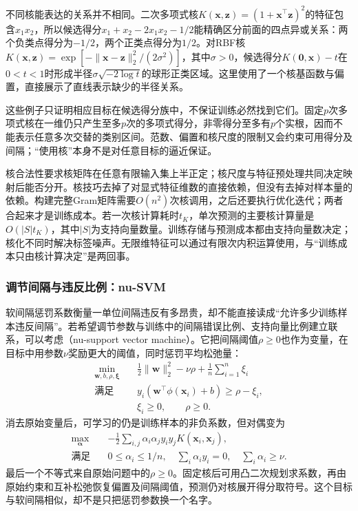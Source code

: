 不同核能表达的关系并不相同。二次多项式核$K(\bm x,\bm z)=(1+\bm x^\top\bm z)^2$的特征包含$x_1x_2$，所以候选得分$x_1+x_2-2x_1x_2-1/2$能精确区分前面的四点异或关系：两个负类点得分为$-1/2$，两个正类点得分为$1/2$。对RBF核$K(\bm x,\bm z)=\exp[-\|\bm x-\bm z\|_2^2/(2\sigma^2)]$，其中$\sigma>0$，候选得分$K(\bm0,\bm x)-t$在$0<t<1$时形成半径$\sigma\sqrt{-2\log t}$的球形正类区域。这里使用了一个核基函数与偏置，直接展示了直线表示缺少的半径关系。

这些例子只证明相应目标在候选得分族中，不保证训练必然找到它们。固定$p$次多项式核在一维仍只产生至多$p$次的多项式得分，非零得分至多有$p$个实根，因而不能表示任意多次交替的类别区间。范数、偏置和核尺度的限制又会约束可用得分及间隔；“使用核”本身不是对任意目标的逼近保证。

核合法性要求核矩阵在任意有限输入集上半正定；核尺度与特征预处理共同决定映射后能否分开。核技巧去掉了对显式特征维数的直接依赖，但没有去掉对样本量的依赖。构建完整Gram矩阵需要$O(n^2)$次核调用，之后还要执行优化迭代；两者合起来才是训练成本。若一次核计算耗时$t_K$，单次预测的主要核计算量是$O(|S|t_K)$，其中$|S|$为支持向量数量。训练存储与预测成本都由支持向量数决定；核化不同时解决标签噪声。无限维特征可以通过有限次内积运算使用，与“训练成本只由核计算决定”是两回事。

\subsubsection{调节间隔与违反比例：nu-SVM}
\label{sec:classification-svm-nu-extension}

软间隔惩罚系数衡量一单位间隔违反有多昂贵，却不能直接读成“允许多少训练样本违反间隔”。若希望调节参数与训练中的间隔错误比例、支持向量比例建立联系，可以考虑（nu-support vector machine）。它把间隔阈值$\rho\geq0$也作为变量，在目标中用参数$\nu$奖励更大的阈值，同时惩罚平均松弛量：
\begin{equation}
  \begin{aligned}
    \min_{\bm{w},b,\rho,\bm{\xi}}\quad&
      \frac12\lVert\bm{w}\rVert_2^2-\nu\rho
      +\frac1n\sum_{i=1}^n\xi_i\\
    \text{满足}\quad&
      y_i(\bm{w}^{\top}\phi(\bm{x}_i)+b)\geq\rho-\xi_i,\\
    &\xi_i\geq0,\qquad \rho\geq0.
  \end{aligned}
  \label{eq:classification-nu-svm}
\end{equation}
消去原始变量后，可学习的仍是训练样本的非负系数，但对偶变为
\[
  \begin{aligned}
    \max_{\bm\alpha}\quad&-\frac12\sum_{i,j}\alpha_i\alpha_jy_iy_jK(\bm x_i,\bm x_j),\\
    \text{满足}\quad&0\leq\alpha_i\leq1/n,\quad
       \sum_i\alpha_i y_i=0,\quad\sum_i\alpha_i\geq\nu.
  \end{aligned}
\]
最后一个不等式来自原始问题中的$\rho\geq0$。固定核后可用凸二次规划求系数，再由原始约束和互补松弛恢复偏置及间隔阈值，预测仍对核展开得分取符号。这个目标与软间隔相似，却不是只把惩罚参数换一个名字。

